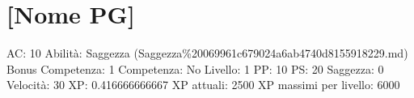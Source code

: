 \section{{[}Nome PG{]}}\label{nome-pg}

AC: 10 Abilità: Saggezza
(Saggezza\%20069961c679024a6ab4740d8155918229.md) Bonus Competenza: 1
Competenza: No Livello: 1 PP: 10 PS: 20 Saggezza: 0 Velocità: 30 XP:
0.416666666667 XP attuali: 2500 XP massimi per livello: 6000
